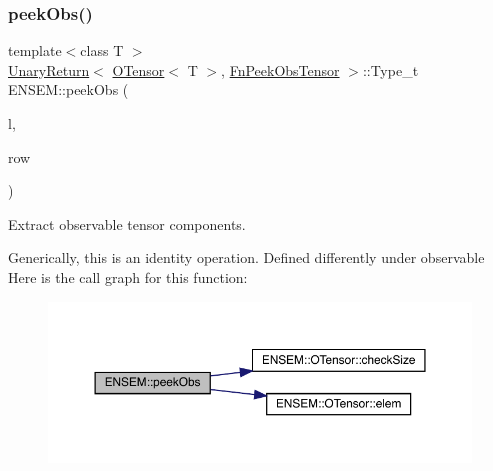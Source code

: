 \subsubsection{\texorpdfstring{peekObs()}{peekObs()}\hspace{0.1cm}{\footnotesize\ttfamily [2/2]}}
{\footnotesize\ttfamily template$<$class T $>$ \\
\mbox{\hyperlink{structENSEM_1_1UnaryReturn}{Unary\+Return}}$<$ \mbox{\hyperlink{classENSEM_1_1OTensor}{O\+Tensor}}$<$ T $>$, \mbox{\hyperlink{structENSEM_1_1FnPeekObsTensor}{Fn\+Peek\+Obs\+Tensor}} $>$\+::Type\+\_\+t E\+N\+S\+E\+M\+::peek\+Obs (\begin{DoxyParamCaption}\item[{const \mbox{\hyperlink{classENSEM_1_1OTensor}{O\+Tensor}}$<$ T $>$ \&}]{l,  }\item[{int}]{row }\end{DoxyParamCaption})\hspace{0.3cm}{\ttfamily [inline]}}



Extract observable tensor components. 

Generically, this is an identity operation. Defined differently under observable Here is the call graph for this function\+:\nopagebreak
\begin{figure}[H]
\begin{center}
\leavevmode
\includegraphics[width=350pt]{de/d87/group__obstensor_ga9fffee5b1bebf7fa7202b9b11ac11b16_cgraph}
\end{center}
\end{figure}
\mbox{\label{group__obstensor_gaeee51a2a721122db062ffe8a3e0192c3}} 
